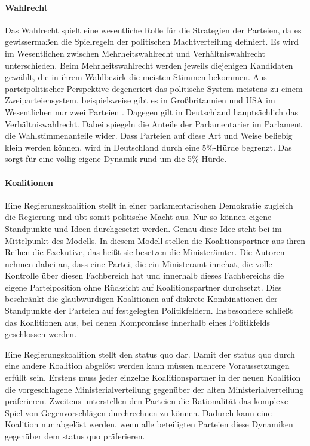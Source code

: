 \paragraph{Wahlrecht}
Das Wahlrecht spielt eine wesentliche Rolle für die Strategien der Parteien, da es gewissermaßen die Spielregeln der politischen Machtverteilung definiert.
Es wird im Wesentlichen zwischen Mehrheitswahlrecht und Verhältniswahlrecht unterschieden.
Beim Mehrheitswahlrecht werden jeweils diejenigen Kandidaten gewählt, die in ihrem Wahlbezirk die meisten Stimmen bekommen.
Aus parteipolitischer Perspektive degeneriert das politische System meistens zu einem Zweiparteiensystem, beispielsweise gibt es in Großbritannien und USA im Wesentlichen nur zwei Parteien \citep[S.\,257-8]{schofield1998germany}.
Dagegen gilt in Deutschland hauptsächlich das Verhältniswahlrecht.
Dabei spiegeln die Anteile der Parlamentarier im Parlament die Wahlstimmenanteile wider.
Dass Parteien auf diese Art und Weise beliebig klein werden können, wird in Deutschland durch eine 5\%-Hürde begrenzt.
Das sorgt für eine völlig eigene Dynamik rund um die 5\%-Hürde.

\paragraph{Koalitionen}
Eine Regierungskoalition stellt in einer parlamentarischen Demokratie zugleich die Regierung und übt somit politische Macht aus.
Nur so können eigene Standpunkte und Ideen durchgesetzt werden. 
Genau diese Idee steht bei \citet{laver1990coalitions} im Mittelpunkt des Modells.
In diesem Modell stellen die Koalitionspartner aus ihren Reihen die Exekutive, das heißt sie besetzen die Ministerämter. Die Autoren nehmen dabei an, dass eine Partei, die ein Ministeramt innehat, die volle Kontrolle über diesen Fachbereich hat und innerhalb dieses Fachbereichs die eigene Parteiposition ohne Rücksicht auf Koalitionspartner durchsetzt. Dies beschränkt die glaubwürdigen Koalitionen auf diskrete Kombinationen der Standpunkte der Parteien auf festgelegten Politikfeldern. Insbesondere schließt das Koalitionen aus, bei denen Kompromisse innerhalb eines Politikfelds geschlossen werden. \citep[S.\,873-5]{laver1990coalitions}

Eine Regierungskoalition stellt den status quo dar. Damit der status quo durch eine andere Koalition abgelöst werden kann müssen mehrere Voraussetzungen erfüllt sein. Erstens muss jeder einzelne Koalitionspartner in der neuen Koalition die vorgeschlagene Ministerialverteilung gegenüber der alten Ministerialverteilung präferieren. Zweitens unterstellen \citet{laver1990coalitions} den Parteien die Rationalität das komplexe Spiel von Gegenvorschlägen durchrechnen zu können. Dadurch kann eine Koalition nur abgelöst werden, wenn alle beteiligten Parteien diese Dynamiken gegenüber dem status quo präferieren. \citep[S.\,877-8]{laver1990coalitions}

